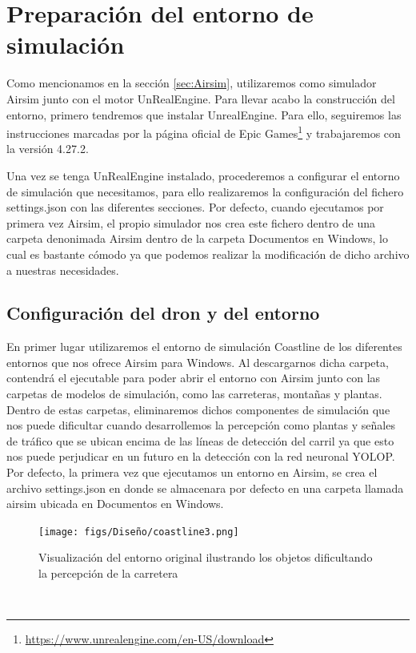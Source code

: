 \section{Preparación del entorno de simulación}
\label{sec:Preparación_entorno}

Como mencionamos en la sección \ref{sec:Airsim}, utilizaremos como simulador Airsim junto con el motor UnRealEngine. Para llevar acabo la construcción del entorno, primero tendremos 
que instalar UnrealEngine. Para ello, seguiremos las instrucciones marcadas por la página oficial de Epic Games\footnote{\url{https://www.unrealengine.com/en-US/download}} y trabajaremos con la versión 4.27.2. 

Una vez se tenga UnRealEngine instalado, procederemos a configurar el entorno de simulación que necesitamos, para ello realizaremos la configuración del fichero settings.json con las diferentes
secciones. Por defecto, cuando ejecutamos por primera vez Airsim, el propio simulador nos crea este fichero dentro de una carpeta denonimada Airsim dentro de la carpeta Documentos en Windows, lo cual
es bastante cómodo ya que podemos realizar la modificación de dicho archivo a nuestras necesidades. 


\subsection{Configuración del dron y del entorno}
\label{subsec:Configuración del dron y del entorno}

En primer lugar utilizaremos el entorno de simulación Coastline de los diferentes entornos que nos ofrece Airsim para Windows. Al descargarnos dicha carpeta, contendrá el ejecutable para
poder abrir el entorno con Airsim junto con las carpetas de modelos de simulación, como las carreteras, montañas y plantas. Dentro de estas carpetas, eliminaremos dichos componentes 
de simulación que nos puede dificultar cuando desarrollemos la percepción como plantas y señales de tráfico que se ubican encima de las líneas de detección del carril ya que esto nos puede perjudicar
en un futuro en la detección con la red neuronal YOLOP.\newline
Por defecto, la primera vez que ejecutamos un entorno en Airsim, se crea el archivo settings.json en donde se almacenara por defecto en una carpeta 
llamada airsim ubicada en Documentos en Windows. \newline

\begin{figure} [H]
  \begin{center}
    \texttt{[image: figs/Diseño/coastline3.png]}
  \end{center}
  \caption{Visualización del entorno original ilustrando los objetos dificultando la
  percepción de la carretera}
  \label{fig:CoastlineModificado}
\end{figure}\

